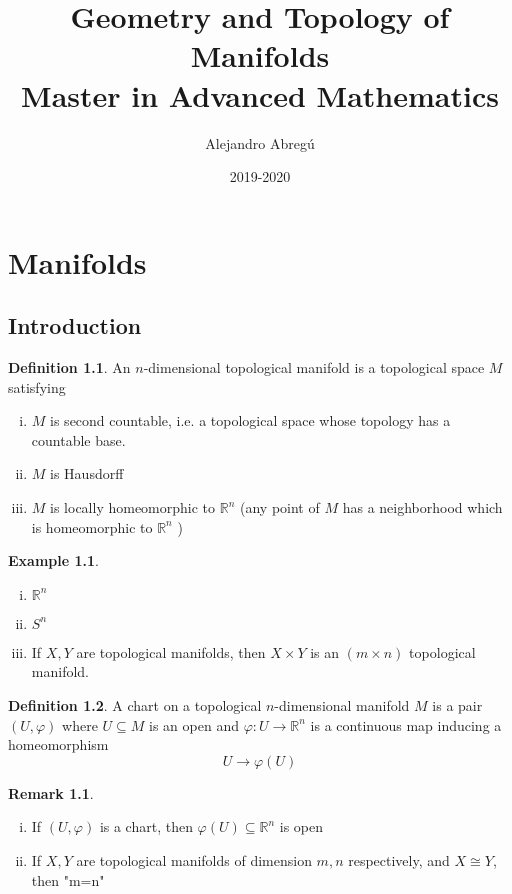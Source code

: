 \documentclass[]{book}
\title{%
	Geometry and Topology of Manifolds \\
	\large Master in Advanced Mathematics}
\date{2019-2020}
\author{Alejandro Abregú}
\theoremstyle{definition}
\newtheorem{defin}{Definition}[section]
\theoremstyle{definition}
\theoremstyle{definition}
\theoremstyle{definition}
\newtheorem*{remark}{Remark}
\theoremstyle{definition}
\theoremstyle{definition}
\theoremstyle{definition}
\theoremstyle{definition}
\theoremstyle{definition}
\newtheorem{ex}{Example}
\theoremstyle{definition}
\theoremstyle{definition}
\newcommand\blankpage{%
	\null
	\thispagestyle{empty}%
	\addtocounter{page}{-1}%
	\newpage}
\newcommand{\R}{\mathbb{R}}
\begin{document}
	
	
\maketitle
\thispagestyle{empty}
\tableofcontents
\thispagestyle{empty}
\clearpage
{} 
\chapter{Manifolds}
\section{Introduction}
\begin{defin}
  An $n$-dimensional topological manifold is a topological space $M$ satisfying
  \begin{enumerate}[i)]
    \item $M$ is second countable, i.e. a topological space whose topology has a countable base.
    \item $M$ is Hausdorff
    \item $M$ is locally homeomorphic to $\R^{n}$ (any point of $M$ has a neighborhood which is
      homeomorphic to $\R^{n}$ )
  \end{enumerate}
\end{defin}
\begin{ex}
  \begin{enumerate}[i)]
    \item $\R^{n}$
    \item $S^{n}$
    \item If $X,Y$ are topological manifolds, then $X \times Y$ is an $(m \times  n)$ topological
      manifold.
  \end{enumerate}
\end{ex}
\begin{defin}
  A chart on a topological $n$-dimensional manifold $M$ is a pair $(U,\varphi)$ where $U \subseteq M$
  is an open and $\varphi:U\longrightarrow \R^{n} $ is a continuous map inducing a homeomorphism
  \[
    U\longrightarrow \varphi(U) 
  \] 
\end{defin}
\begin{remark}
  \begin{enumerate}[i)]
    \item If $(U,\varphi)$ is a chart, then $\varphi(U)\subseteq \R^{n}$ is open
    \item If $X,Y$ are topological manifolds of dimension $m,n$ respectively, and $X \cong Y$, then
      "m=n"
  \end{enumerate}
\end{remark}
\end{document}

